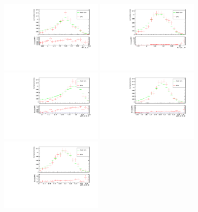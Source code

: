 \begin{figure}[h]
\begin{center}
\includegraphics[width=0.45\textwidth]{Figures/Chapter4/BDT_pt_5_7_mc_validation_Bu.pdf}
\includegraphics[width=0.45\textwidth]{Figures/Chapter4/BDT_pt_7_10_mc_validation_Bu.pdf}
\includegraphics[width=0.45\textwidth]{Figures/Chapter4/BDT_pt_10_15_mc_validation_Bu.pdf}
\includegraphics[width=0.45\textwidth]{Figures/Chapter4/BDT_pt_15_20_mc_validation_Bu.pdf}
\includegraphics[width=0.45\textwidth]{Figures/Chapter4/BDT_pt_20_30_mc_validation_Bu.pdf}

\end{center}
\end{figure}
